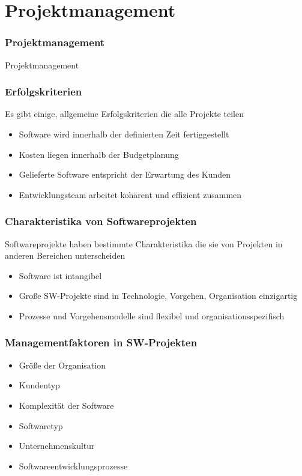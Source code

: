 
\section{Projektmanagement}
\begin{frame}[fragile]
	\frametitle{Projektmanagement}
\huge Projektmanagement
\end{frame}

\begin{frame}
\frametitle{Erfolgskriterien}
	Es gibt einige, allgemeine Erfolgskriterien die alle Projekte teilen
	\begin{itemize}
		\item Software wird innerhalb der definierten Zeit fertiggestellt
		\item Kosten liegen innerhalb der Budgetplanung
		\item Gelieferte Software entspricht der Erwartung des Kunden
		\item Entwicklungsteam arbeitet kohärent und effizient zusammen
	\end{itemize}
\end{frame}

\begin{frame}
\frametitle{Charakteristika von Softwareprojekten}
	Softwareprojekte haben bestimmte Charakteristika die sie von Projekten
	in anderen Bereichen unterscheiden
	\begin{itemize}
		\item Software ist intangibel
		\item Große SW-Projekte sind in Technologie, Vorgehen, Organisation
		einzigartig
		\item Prozesse und Vorgehensmodelle sind flexibel und organisationsspezifisch
	\end{itemize}
\end{frame}

\begin{frame}
\frametitle{Managementfaktoren in SW-Projekten}
	\begin{itemize}
		\item Größe der Organisation
		\item Kundentyp
		\item Komplexität der Software
		\item Softwaretyp
		\item Unternehmenskultur
		\item Softwareentwicklungsprozesse
	\end{itemize}
\end{frame}

